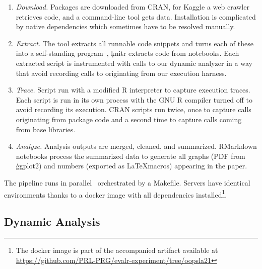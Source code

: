 \documentclass[screen,acmsmall]{acmart}
\begin{document}
\begin{enumerate}
\item \emph{Download.} Packages are downloaded from CRAN, for Kaggle a web
  crawler retrieves code, and a command-line tool gets data. Installation is
  complicated by native dependencies which sometimes have to be resolved
  manually.
\item \emph{Extract.} The \genthat tool extracts all runnable code snippets and
  turns each of these into a self-standing program~\cite{issta18}, \c{knitr}
  extracts code from notebooks. Each extracted script is instrumented with calls
  to our dynamic analyzer in a way that avoid recording calls to \eval
  originating from our execution harness.
\item \emph{Trace.} Script run with a modified R interpreter to capture
  execution traces. Each script is run in its own process with the GNU R
  compiler turned off to avoid recording its execution. CRAN scripts run twice,
  once to capture \eval calls originating from package code and a second time to
  capture calls coming from base libraries.
\item \emph{Analyze.} Analysis outputs are merged, cleaned, and summarized.
  RMarkdown notebooks process the summarized data to generate all graphs (PDF
  from \c{ggplot2}) and numbers (exported as \LaTeX macros) appearing in the
  paper.
\end{enumerate}

\vspace{1mm} 
\noindent The pipeline runs in parallel~\cite{GNUparallel}
orchestrated by a Makefile. Servers have identical environments thanks to a
docker image with all dependencies installed\footnote{The docker image is part
  of the accompanied artifact available at\\
\url{https://github.com/PRL-PRG/evalr-experiment/tree/oopsla21}}.

\subsection{Dynamic Analysis}
\end{document}
